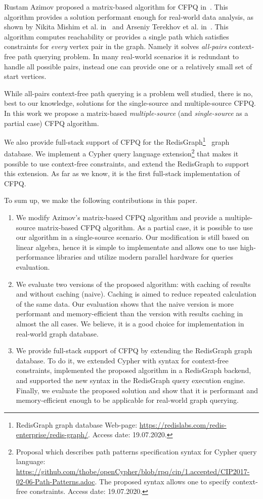 Rustam Azimov proposed a matrix-based algorithm for CFPQ in~\cite{Azimov:2018:CPQ:3210259.3210264}.
This algorithm provides a solution performant enough for real-world data analysis, as shown by Nikita Mishim et al. in~\cite{Mishin:2019:ECP:3327964.3328503} and Arseniy Terekhov et al. in~\cite{10.1145/3398682.3399163}.
This algorithm computes reachability or provides a single path which satisfies constraints for \emph{every} vertex pair in the graph.
Namely it solves \emph{all-pairs} context-free path querying problem.
In many real-world scenarios it is redundant to handle all possible pairs, instead one can provide one or a relatively small set of start vertices.

While all-pairs context-free path querying is a problem well studied, there is no, best to our knowledge, solutions for the single-source and multiple-source CFPQ.
In this work we propose a matrix-based \textit{multiple-source} (and \textit{single-source} as a partial case) CFPQ algorithm.

We also provide full-stack support of CFPQ for the RedisGraph\footnote{RedisGraph graph database Web-page: \url{https://redislabs.com/redis-enterprise/redis-graph/}. Access date: 19.07.2020.}~\cite{8778293} graph database.
We implement a Cypher query language extension\footnote{Proposal which describes path patterns specification syntax for Cypher query language: \url{https://github.com/thobe/openCypher/blob/rpq/cip/1.accepted/CIP2017-02-06-Path-Patterns.adoc}.
The proposed syntax allows one to specify context-free constraints. Access date: 19.07.2020.} that makes it possible to use context-free constraints, and extend the RedisGraph to support this extension.
As far as we know, it is the first full-stack implementation of CFPQ.

To sum up, we make the following contributions in this paper.
\begin{enumerate}
	\item We modify Azimov's matrix-based CFPQ algorithm and provide a multiple-source matrix-based CFPQ algorithm.
	As a partial case, it is possible to use our algorithm in a single-source scenario.
	Our modification is still based on linear algebra, hence it is simple to implementate and allows one to use high-performance libraries and utilize modern parallel hardware for queries evaluation.
	\item We evaluate two versions of the proposed algorithm: with caching of results and without caching (naive).
	Caching is aimed to reduce repeated calculation of the same data.
	Our evaluation shows that the naive version is more performant and memory-efficient than the version with results caching in almost the all cases.
	We believe, it is a good choice for implementation in real-world graph database.
	\item We provide full-stack support of CFPQ by extending the RedisGraph graph database.
	To do it, we extended Cypher with syntax for context-free constraints, implemented the proposed algorithm in a RedisGraph backend, and supported the new syntax in the RedisGraph query execution engine.
	Finally, we evaluate the proposed solution and show that it is performant and memory-efficient enough to be applicable for real-world graph querying.
\end{enumerate}